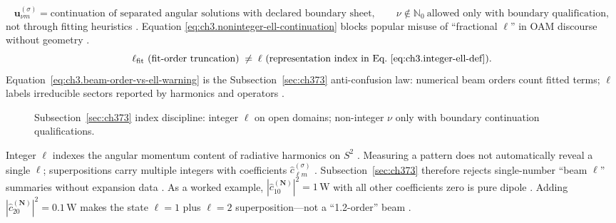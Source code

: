 \begin{equation}
\label{eq:ch3.noninteger-ell-continuation}
\mathbf{u}_{\nu m}^{(\sigma)}
=
\text{continuation of separated angular solutions with declared boundary sheet},
\qquad
\nu\notin\mathbb{N}_{0}\ \text{allowed only with boundary qualification},
\end{equation}
not through fitting heuristics \cite{stratton1941}. Equation
\eqref{eq:ch3.noninteger-ell-continuation} blocks popular misuse of ``fractional \(\ell\)'' in OAM discourse without
geometry \cite{allen1992}.
\begin{equation}
\label{eq:ch3.beam-order-vs-ell-warning}
\ell_{\mathrm{fit}}\ \text{(fit-order truncation)}
\;\neq\;
\ell\ \text{(representation index in Eq.~\eqref{eq:ch3.integer-ell-def})}.
\end{equation}
Equation~\eqref{eq:ch3.beam-order-vs-ell-warning} is the Subsection~\ref{sec:ch373} anti-confusion law: numerical beam
orders count fitted terms; \(\ell\) labels irreducible sectors reported by harmonics and operators
\cite{harrington2001}.
\begin{figure}[t]
\centering
{}
\caption{Subsection~\ref{sec:ch373} index discipline: integer \(\ell\) on open domains; non-integer \(\nu\) only with
boundary continuation qualifications.}
\label{fig:ch3.373-index-discipline}
\end{figure}
Integer \(\ell\) indexes the angular momentum content of radiative harmonics on \(S^{2}\) \cite{jackson1999}.
Measuring a pattern does not automatically reveal a single \(\ell\); superpositions carry multiple integers with
coefficients \(\widehat{c}_{\ell m}^{(\sigma)}\) \cite{harrington2001}. Subsection~\ref{sec:ch373} therefore
rejects single-number ``beam \(\ell\)'' summaries without expansion data \cite{harrington2001}.
As a worked example, \(|\widehat{c}_{10}^{(\mathbf{N})}|^{2}=1\,\mathrm{W}\) with all other coefficients zero is pure dipole
\cite{hansen1988}. Adding \(|\widehat{c}_{20}^{(\mathbf{N})}|^{2}=0.1\,\mathrm{W}\) makes the state
\(\ell=1\) plus \(\ell=2\) superposition---not a ``1.2-order'' beam \cite{harrington2001}.
